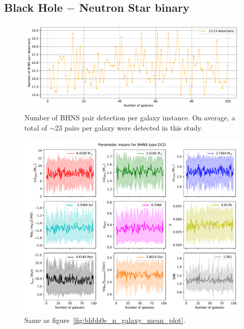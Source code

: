 \subsection{Black Hole $-$ Neutron Star binary}
\begin{figure}[!h]
    \centering
    \includegraphics[width=\columnwidth]{analysis_data/004__images_for_latex/BHNS0e_n_detections}
    \caption{Number of BHNS pair detection per galaxy instance. On average, a total of $\sim$23 pairs per galaxy were detected in this study.}
    \label{fig:bhns0endetections}
\end{figure}

\begin{figure}[!h]
    \centering
    \includegraphics[width=\columnwidth]{analysis_data/004__images_for_latex/BHNS0e_n_galaxy_mean_plot}
    \caption{Same as figure~\ref{fig:bhbh0e_n_galaxy_mean_plot}.}
    \label{fig:bhns0e_n_galaxy_mean_plot}
\end{figure}
